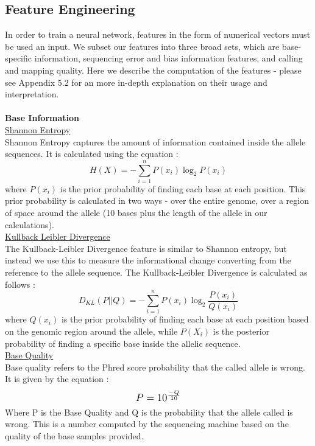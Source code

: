 \documentclass{article}
\begin{document}
\subsection{Feature Engineering}
In order to train a neural network, features in the form of numerical vectors must be used an input. We subset our features into three broad sets, which are base-specific information, sequencing error and bias information features, and calling and mapping quality. Here we describe the computation of the features - please see Appendix 5.2 for an more in-depth explanation on their usage and interpretation.\\\\
\textbf{Base Information} \\[0.3\baselineskip]
\underline{Shannon Entropy}\\
Shannon Entropy captures the amount of information contained inside the allele sequences. It is calculated using the equation :
\begin{equation}
H(X) = -\sum_{i=1}^{n}P(x_i)\log_{2}P(x_i)
\end{equation}
where $P(x_i)$ is the prior probability of finding each base at each position. This prior probability is calculated in two ways - over the entire genome, over a region of space around the allele (10 bases plus the length of the allele in our calculations).\\[0.3\baselineskip]
\underline{Kullback Leibler Divergence}\\
The Kullback-Leibler Divergence feature is similar to Shannon entropy, but instead we use this to measure the informational change converting from the reference to the allele sequence. The Kullback-Leibler Divergence is calculated as follows :
\begin{equation}
D_{KL}(P||Q) = -\sum_{i=1}^{n}P(x_i)\log_{2}{\frac{P(x_i)}{Q(x_i)}}
\end{equation}
where $Q(x_i)$ is the prior probability of finding each base at each position based on the genomic region around the allele, while $P(X_i)$ is the posterior probability of finding a specific base inside the allelic sequence.\\[0.3\baselineskip]
\underline{Base Quality}\\
Base quality refers to the Phred score probability that the called allele is wrong. It is given by the equation :
\[ \scalebox{1.2}{$P=10^{\frac{-Q}{10}}$} \]
Where P is the Base Quality and Q is the probability that the allele called is wrong. This is a number computed by the sequencing machine based on the quality of the base samples provided.\\\\
\end{document}
